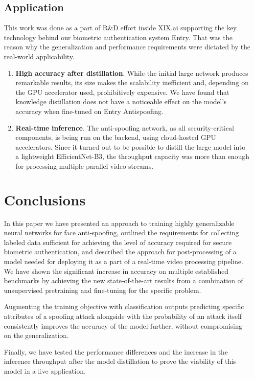 \documentclass[10pt,twocolumn,letterpaper]{article}
\begin{document}
\subsection{Application}


This work was done as a part of R\&D effort inside XIX.ai supporting the key technology behind our biometric authentication system Entry. That was the reason why the generalization and performance requirements were dictated by the real-world applicability. 

\begin{enumerate}
    \item \textbf{High accuracy after distillation}. While the initial large network produces remarkable results, its size makes the scalability inefficient and, depending on the GPU accelerator used, prohibitively expensive. We have found that knowledge distillation does not have a noticeable effect on the model's accuracy when fine-tuned on Entry Antispoofing.
    \item \textbf{Real-time inference}. The anti-spoofing network, as all security-critical components, is being run on the backend, using cloud-hosted GPU accelerators. Since it turned out to be possible to distill the large model into a lightweight EfficientNet-B3, the throughput capacity was more than enough for processing multiple parallel video streams.
\end{enumerate}

\section{Conclusions}

In this paper we have presented an approach to training highly generalizable neural networks for face anti-spoofing, outlined the requirements for collecting labeled data sufficient for achieving the level of accuracy required for secure biometric authentication, and described the approach for post-processing of a model needed for deploying it as a part of a real-time video processing pipeline. We have shown the significant increase in accuracy on multiple established benchmarks by achieving the new state-of-the-art results from a combination of unsupervised pretraining and fine-tuning for the specific problem.

Augmenting the training objective with classification outputs predicting specific attributes of a spoofing attack alongside with the probability of an attack itself consistently improves the accuracy of the model further, without compromising on the generalization.

Finally, we have tested the performance differences and the increase in the inference throughput after the model distillation to prove the viability of this model in a live application.

{\small


}
\end{document}
